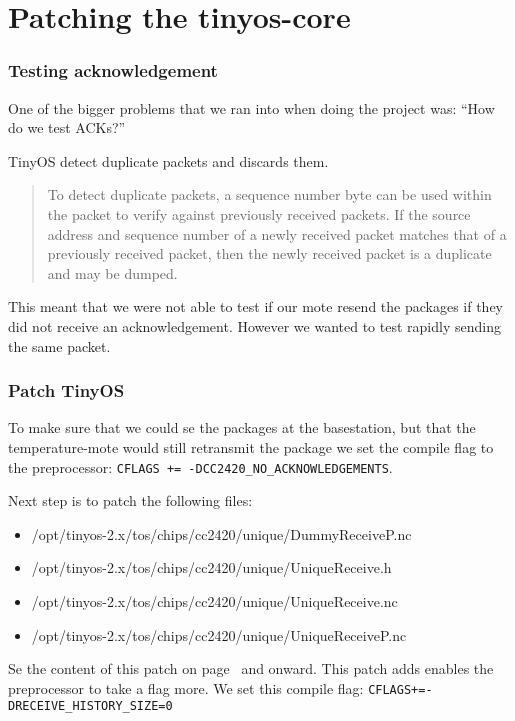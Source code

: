 \section{Patching the tinyos-core}

\subsubsection{Testing acknowledgement}
One of the bigger problems that we ran into when doing the project was: ``How
do we test ACKs?''

TinyOS detect duplicate packets and discards them.

\begin{quote}
To detect duplicate packets, a sequence number byte can be used within the
packet to verify against previously received packets. If the source address and
sequence number of a newly received packet matches that of a previously
received packet, then the newly received packet is a duplicate and may be
dumped.\cite[chapter 2.2]{PaketLink}
\end{quote}


This meant that we were not
able to test if our mote resend the packages if they did not receive an
acknowledgement. However we wanted to test rapidly sending the
same packet. 

\subsubsection{Patch TinyOS}

To make sure that we could se the packages at the basestation, but that the
temperature-mote would still retransmit the package we set the compile flag to
the preprocessor: \texttt{CFLAGS += -DCC2420\_NO\_ACKNOWLEDGEMENTS}.

Next step is to patch the following files: 

\begin{itemize}
	\item /opt/tinyos-2.x/tos/chips/cc2420/unique/DummyReceiveP.nc
	\item /opt/tinyos-2.x/tos/chips/cc2420/unique/UniqueReceive.h
	\item /opt/tinyos-2.x/tos/chips/cc2420/unique/UniqueReceive.nc
	\item /opt/tinyos-2.x/tos/chips/cc2420/unique/UniqueReceiveP.nc
\end{itemize}

Se the content of this patch on page~\pageref{src:uniqRecP} and onward. This
patch adds enables the preprocessor to take a flag more. We set this compile
flag: \texttt{CFLAGS+=-DRECEIVE\_HISTORY\_SIZE=0}

